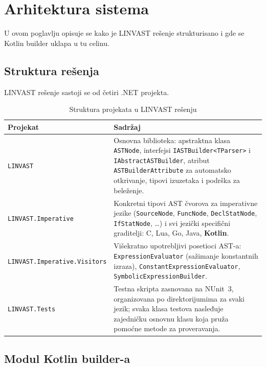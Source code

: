 \documentclass[a4paper]{article}
\begin{document}
\newpage
\section{Arhitektura sistema}

U ovom poglavlju opisuje se kako je LINVAST rešenje strukturisano i gde
se Kotlin builder uklapa u tu celinu.

\subsection{Struktura rešenja}

LINVAST rešenje sastoji se od četiri .NET projekta.

\begin{table}[H]
\centering
\begin{tabularx}{\textwidth}{lX}
\toprule
\textbf{Projekat} & \textbf{Sadržaj} \\
\midrule
\texttt{LINVAST} &
    Osnovna biblioteka: apstraktna klasa \texttt{ASTNode},
    interfejsi \texttt{IASTBuilder<TParser>} i \texttt{IAbstractASTBuilder},
    atribut \texttt{ASTBuilderAttribute} za automatsko otkrivanje,
    tipovi izuzetaka i podrška za beleženje. \\
\addlinespace
\texttt{LINVAST.Imperative} &
    Konkretni tipovi AST čvorova za imperativne jezike (\texttt{SourceNode},
    \texttt{FuncNode}, \texttt{DeclStatNode}, \texttt{IfStatNode}, \ldots) i
    svi jezički specifični graditelji: C, Lua, Go, Java, \textbf{Kotlin}. \\
\addlinespace
\texttt{LINVAST.Imperative.Visitors} &
    Višekratno upotrebljivi posetioci AST-a: \texttt{ExpressionEvaluator}
    (sažimanje konstantnih izraza), \texttt{ConstantExpressionEvaluator},
    \texttt{SymbolicExpressionBuilder}. \\
\addlinespace
\texttt{LINVAST.Tests} &
    Testna skripta zasnovana na NUnit~3, organizovana po direktorijumima
    za svaki jezik; svaka klasa testova nasleđuje zajedničku osnovnu klasu
    koja pruža pomoćne metode za proveravanja. \\
\bottomrule
\end{tabularx}
\caption{Struktura projekata u LINVAST rešenju}
\end{table}

\subsection{Modul Kotlin builder-a}
\end{document}
